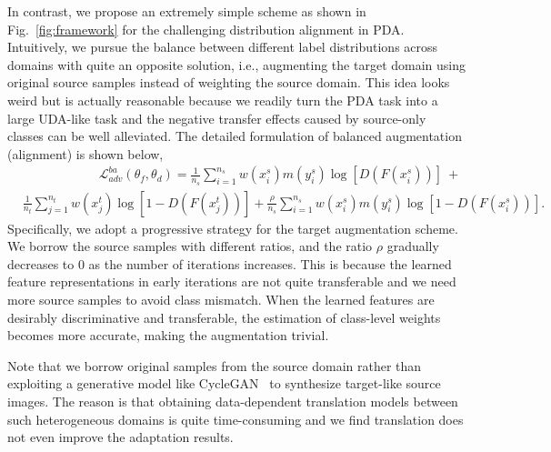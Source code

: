 \documentclass[runningheads]{llncs}
\begin{document}
In contrast, we propose an extremely simple scheme as shown in Fig.~\ref{fig:framework} for the challenging distribution alignment in PDA.
Intuitively, we pursue the balance between different label distributions across domains with quite an opposite solution, i.e., augmenting the target domain using original source samples instead of weighting the source domain.
This idea looks weird but is actually reasonable because we readily turn the PDA task into a large UDA-like task and the negative transfer effects caused by source-only classes can be well alleviated. 
The detailed formulation of balanced augmentation (alignment) is shown below,
\begin{equation}
\begin{aligned}
& \qquad\qquad\qquad \mathcal{L}_{adv}^{ba}(\theta_f,\theta_d) = \frac{1}{n_s} \sum\nolimits_{i=1}^{n_s} w(x_i^s) m(y_i^s) \log[D(F(x_i^s))]\ +\\ 
& \frac{1}{n_t} \sum\nolimits_{j=1}^{n_t} w(x_j^t)\log[1 - D(F(x_j^t))] + \frac{\rho}{n_s} \sum\nolimits_{i=1}^{n_s} w(x_i^s) m(y_i^s) \log[1-D(F(x_i^s))].
\end{aligned}
\label{aug}
\end{equation}
Specifically, we adopt a progressive strategy for the target augmentation scheme. We borrow the source samples with different ratios, and the ratio $\rho$ gradually decreases to 0 as the number of iterations increases.
This is because the learned feature representations in early iterations are not quite transferable and we need more source samples to avoid class mismatch.
When the learned features are desirably discriminative and transferable, the estimation of class-level weights becomes more accurate, making the augmentation trivial.
	
	
Note that we borrow original samples from the source domain rather than exploiting a generative model like CycleGAN~\cite{zhu2017unpaired} to synthesize target-like source images. 
The reason is that obtaining data-dependent translation models between such heterogeneous domains is quite time-consuming and we find translation does not even improve the adaptation results.
\end{document}
